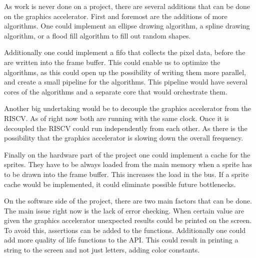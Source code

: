 As work is never done on a project, there are several additions that can be done on the graphics accelerator. First and foremost are the additions of more algorithms. One could implement an ellipse drawing algorithm, a spline drawing algorithm, or a flood fill algorithm to fill out random shapes. 

Additionally one could implement a fifo that collects the pixel data, before the are written into the frame buffer. This could enable us to optimize the algorithms, as this could open up the possibility of writing them more parallel, and create a small pipeline for the algorithms. This pipeline would have several cores of the algorithms and a separate core that would orchestrate them.

Another big undertaking would be to decouple the graphics accelerator from the RISCV. As of right now both are running with the same clock. Once it is decoupled the RISCV could run independently from each other. As there is the possibility that the graphics accelerator is slowing down the overall frequency.

Finally on the hardware part of the project one could implement a cache for the sprites. They have to be always loaded from the main memory when a sprite has to be drawn into the frame buffer. This increases the load in the bus. If a sprite cache would be implemented, it could eliminate possible future bottlenecks.

On the software side of the project, there are two main factors that can be done. The main issue right now is the lack of error checking. When certain value are given the graphics accelerator unexpected results could be printed on the screen. To avoid this, assertions can be added to the functions. Additionally one could add more quality of life functions to the API. This could result in printing a string to the screen and not just letters, adding color constants.
